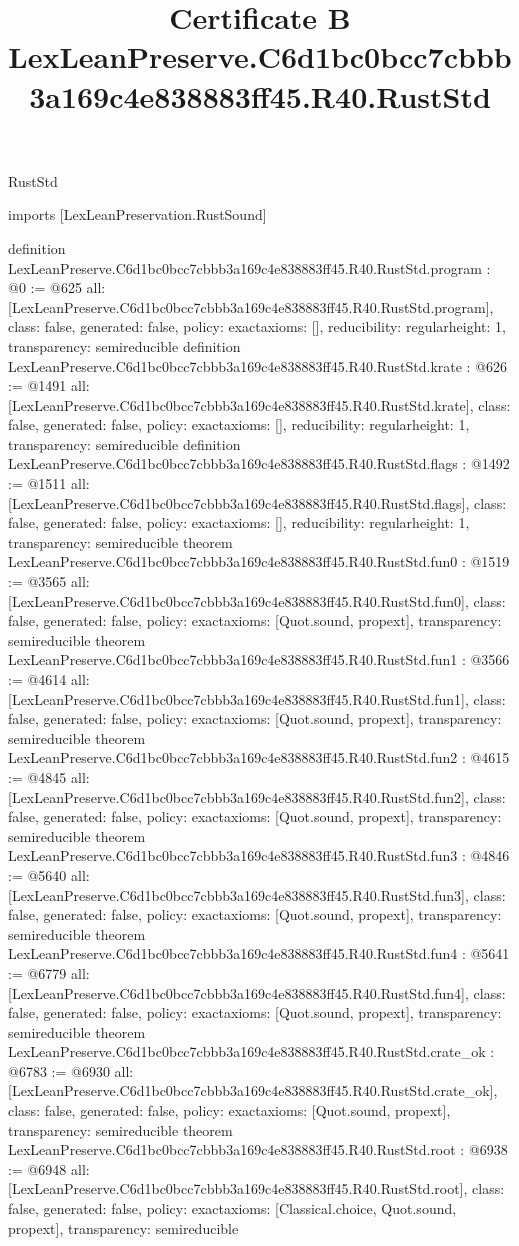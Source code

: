\begin{lexlean}{RustStd}
\title{Certificate B LexLeanPreserve.C6d1bc0bcc7cbbb3a169c4e838883ff45.R40.RustStd}
\begin{coremodule}
imports [LexLeanPreservation.RustSound]

definition LexLeanPreserve.C6d1bc0bcc7cbbb3a169c4e838883ff45.R40.RustStd.program : @0 := @625 {
  all: [LexLeanPreserve.C6d1bc0bcc7cbbb3a169c4e838883ff45.R40.RustStd.program],
  class: false,
  generated: false,
  policy: exact{axioms: []},
  reducibility: regular{height: 1},
  transparency: semireducible
}
definition LexLeanPreserve.C6d1bc0bcc7cbbb3a169c4e838883ff45.R40.RustStd.krate : @626 := @1491 {
  all: [LexLeanPreserve.C6d1bc0bcc7cbbb3a169c4e838883ff45.R40.RustStd.krate],
  class: false,
  generated: false,
  policy: exact{axioms: []},
  reducibility: regular{height: 1},
  transparency: semireducible
}
definition LexLeanPreserve.C6d1bc0bcc7cbbb3a169c4e838883ff45.R40.RustStd.flags : @1492 := @1511 {
  all: [LexLeanPreserve.C6d1bc0bcc7cbbb3a169c4e838883ff45.R40.RustStd.flags],
  class: false,
  generated: false,
  policy: exact{axioms: []},
  reducibility: regular{height: 1},
  transparency: semireducible
}
theorem LexLeanPreserve.C6d1bc0bcc7cbbb3a169c4e838883ff45.R40.RustStd.fun0 : @1519 := @3565 {
  all: [LexLeanPreserve.C6d1bc0bcc7cbbb3a169c4e838883ff45.R40.RustStd.fun0],
  class: false,
  generated: false,
  policy: exact{axioms: [Quot.sound, propext]},
  transparency: semireducible
}
theorem LexLeanPreserve.C6d1bc0bcc7cbbb3a169c4e838883ff45.R40.RustStd.fun1 : @3566 := @4614 {
  all: [LexLeanPreserve.C6d1bc0bcc7cbbb3a169c4e838883ff45.R40.RustStd.fun1],
  class: false,
  generated: false,
  policy: exact{axioms: [Quot.sound, propext]},
  transparency: semireducible
}
theorem LexLeanPreserve.C6d1bc0bcc7cbbb3a169c4e838883ff45.R40.RustStd.fun2 : @4615 := @4845 {
  all: [LexLeanPreserve.C6d1bc0bcc7cbbb3a169c4e838883ff45.R40.RustStd.fun2],
  class: false,
  generated: false,
  policy: exact{axioms: [Quot.sound, propext]},
  transparency: semireducible
}
theorem LexLeanPreserve.C6d1bc0bcc7cbbb3a169c4e838883ff45.R40.RustStd.fun3 : @4846 := @5640 {
  all: [LexLeanPreserve.C6d1bc0bcc7cbbb3a169c4e838883ff45.R40.RustStd.fun3],
  class: false,
  generated: false,
  policy: exact{axioms: [Quot.sound, propext]},
  transparency: semireducible
}
theorem LexLeanPreserve.C6d1bc0bcc7cbbb3a169c4e838883ff45.R40.RustStd.fun4 : @5641 := @6779 {
  all: [LexLeanPreserve.C6d1bc0bcc7cbbb3a169c4e838883ff45.R40.RustStd.fun4],
  class: false,
  generated: false,
  policy: exact{axioms: [Quot.sound, propext]},
  transparency: semireducible
}
theorem LexLeanPreserve.C6d1bc0bcc7cbbb3a169c4e838883ff45.R40.RustStd.crate_ok : @6783 := @6930 {
  all: [LexLeanPreserve.C6d1bc0bcc7cbbb3a169c4e838883ff45.R40.RustStd.crate_ok],
  class: false,
  generated: false,
  policy: exact{axioms: [Quot.sound, propext]},
  transparency: semireducible
}
theorem LexLeanPreserve.C6d1bc0bcc7cbbb3a169c4e838883ff45.R40.RustStd.root : @6938 := @6948 {
  all: [LexLeanPreserve.C6d1bc0bcc7cbbb3a169c4e838883ff45.R40.RustStd.root],
  class: false,
  generated: false,
  policy: exact{axioms: [Classical.choice, Quot.sound, propext]},
  transparency: semireducible
}


\end{coremodule}
\end{lexlean}
